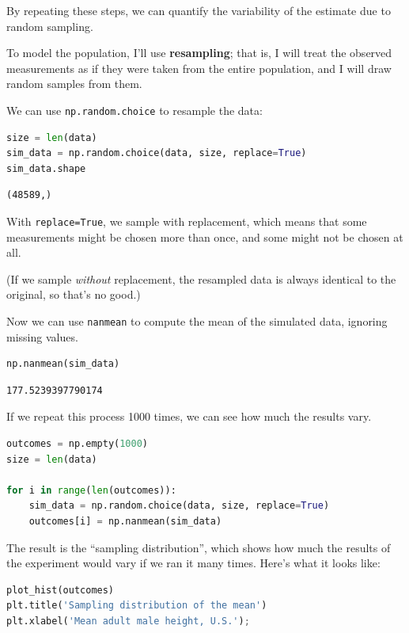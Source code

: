 By repeating these steps, we can quantify the variability of the
estimate due to random sampling.

To model the population, I'll use \textbf{resampling}; that is, I will
treat the observed measurements as if they were taken from the entire
population, and I will draw random samples from them.

We can use \passthrough{\lstinline!np.random.choice!} to resample the
data:

\begin{lstlisting}[language=Python,style=source]
size = len(data)
sim_data = np.random.choice(data, size, replace=True)
sim_data.shape
\end{lstlisting}

\begin{lstlisting}[style=output]
(48589,)
\end{lstlisting}

With \passthrough{\lstinline!replace=True!}, we sample with replacement,
which means that some measurements might be chosen more than once, and
some might not be chosen at all.

(If we sample \emph{without} replacement, the resampled data is always
identical to the original, so that's no good.)

Now we can use \passthrough{\lstinline!nanmean!} to compute the mean of
the simulated data, ignoring missing values.

\begin{lstlisting}[language=Python,style=source]
np.nanmean(sim_data)
\end{lstlisting}

\begin{lstlisting}[style=output]
177.5239397790174
\end{lstlisting}

If we repeat this process 1000 times, we can see how much the results
vary.

\begin{lstlisting}[language=Python,style=source]
outcomes = np.empty(1000)
size = len(data)

for i in range(len(outcomes)):
    sim_data = np.random.choice(data, size, replace=True)
    outcomes[i] = np.nanmean(sim_data)
\end{lstlisting}

The result is the ``sampling distribution'', which shows how much the
results of the experiment would vary if we ran it many times. Here's
what it looks like:

\begin{lstlisting}[language=Python,style=source]
plot_hist(outcomes)
plt.title('Sampling distribution of the mean')
plt.xlabel('Mean adult male height, U.S.');
\end{lstlisting}

